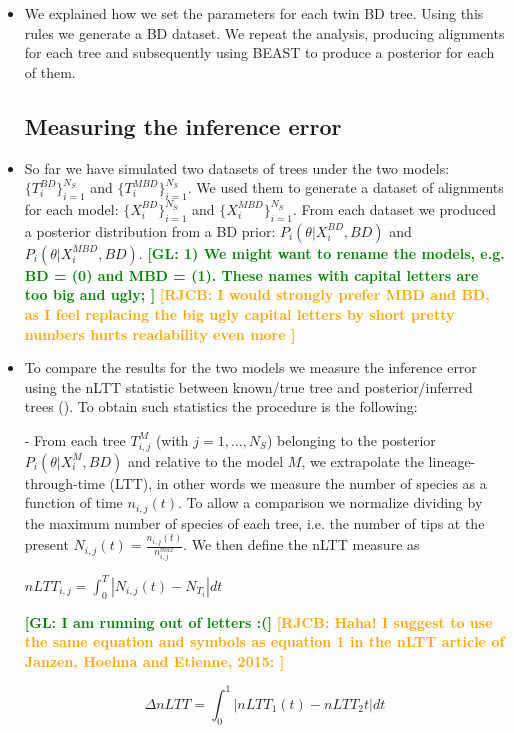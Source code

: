 \documentclass{article}
\newcommand*\richel[1]{\textcolor{orange}{\textbf{[RJCB: #1]}}}
\newcommand*\gio[1]{\textcolor{green}{\textbf{[GL: #1]}}}
\begin{document}
\begin{itemize}
\item We explained how we set the parameters for each twin BD tree. 
Using this rules we generate a BD dataset. 
We repeat the analysis, producing alignments for each tree 
and subsequently using BEAST to produce a posterior for each of them.

\subsection{Measuring the inference error}

\item So far we have simulated two datasets of trees under the two models: 
$\{T_{i}^{BD}\}_{i=1}^{N_{S}}$ and $\{T_{i}^{MBD}\}_{i=1}^{N_{S}}$.
We used them to generate a dataset of alignments for each model: $\{X^{BD}_{i}\}_{i=1}^{N_{S}}$ and $\{X^{MBD}_{i}\}_{i=1}^{N_{S}}$. From each dataset we produced a posterior distribution from a BD prior: 
$P_{i}(\theta | X^{BD}_{i}, BD)$ and $P_{i}(\theta | X^{MBD}_{i}, BD)$.
\gio{
  1) We might want to rename the models, e.g. BD = (0) and MBD = (1). 
  These names with capital letters are too big and ugly;
}
\richel{
  I would strongly prefer MBD and BD, as I feel replacing the big ugly 
  capital letters by short pretty numbers hurts readability even more 
}

\item To compare the results for the two models we measure the inference 
error using the nLTT statistic between known/true tree and 
posterior/inferred trees (\cite{nltt}). 
To obtain such statistics the procedure is the following:

- From each tree $T_{i,j}^{M}$ (with $j=1,...,N_{S}$) 
  belonging to the posterior $P_{i}(\theta | X^{M}_{i}, BD)$ 
  and relative to the model $M$, we extrapolate the lineage-through-time (LTT), 
  in other words we measure the number of species as a function of 
  time $n_{i,j}(t)$. To allow a comparison we normalize dividing by the 
  maximum number of species of each tree, i.e. the number of tips at the 
  present $N_{i,j}(t)=\frac{n_{i,j}(t)}{n^{max}_{i,j}}$. We then define the 
  nLTT measure as

$nLTT_{i,j} = \int_{0}^{T} | N_{i,j}(t) - N_{T_{i}} | dt$

\gio{I am running out of letters :(}
\richel{Haha! I suggest to use the same equation and symbols 
  as equation 1 in
  the nLTT article of Janzen, Hoehna and Etienne, 2015:
}

$$
\Delta nLTT = \int_{0}^{1} | nLTT_1(t) - nLTT_2{t} | dt
$$


\end{itemize}
\end{document}
